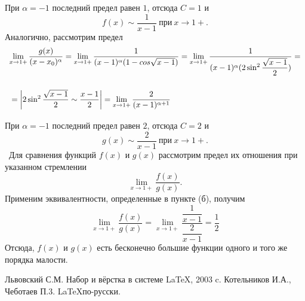 \documentclass[12pt]{article}
\begin{document}
	При $\alpha=-1 $ последний предел равен $1$, отсюда $C=1$ и 
	$$
	f(x)\sim \dfrac{1}{x-1} ~\text{при}~x\rightarrow 1+.
	$$
	Аналогично, рассмотрим предел
	$$
	\begin{array}{l}
		\lim\limits_{x\rightarrow 1+}\dfrac{g(x)}{(x-x_0)^{\alpha}}=\lim\limits_{x\rightarrow 1+} \dfrac{1}{(x-1)^{\alpha}(1-cos\sqrt{x-1})} =\lim\limits_{x\rightarrow 1+} \dfrac{1}{(x-1)^{\alpha}(2\sin^2\dfrac{\sqrt{x-1}}{2})}=\\ \medskip{}{} \\ \medskip{}{}=\left|2\sin^2\dfrac{\sqrt{x-1}}{2} \sim \dfrac{x-1}{2} \right|=\lim\limits_{x\rightarrow 1+} \dfrac{2}{(x-1)^{\alpha+1}}
	\end{array}
	$$
	При $\alpha=-1$ последний предел равен $2$, отсюда $C=2$ и
	$$
	g(x)\sim\dfrac{2}{x-1}~\text{при}~x\rightarrow 1+.
	$$
	~Для сравнения функций $f(x)$ и $g(x)$ рассмотрим предел их отношения при указанном стремлении
	$$
	\lim\limits_{x\rightarrow 1+}\dfrac{f(x)}{g(x)}.
	$$
	Применим эквивалентности, определенные в пункте (б), получим
	$$
	\lim\limits_{x\rightarrow 1+}\dfrac{f(x)}{g(x)} = \lim\limits_{x\rightarrow 1+}\dfrac{\dfrac{1}{x-1}}{\dfrac{2}{x-1}}=\dfrac{1}{2}
	$$
	Отсюда, $f(x)$ и $g(x)$ есть бесконечно большие функции одного и того же порядка малости.
	\newpage
	\begin{thebibliography}{99}
		 Львовский С.М. Набор и вёрстка в системе \LaTeX, 2003 c.
		 Котельников И.А., Чеботаев П.3. \LaTeX по-русски.
	\end{thebibliography}
\end{document}
